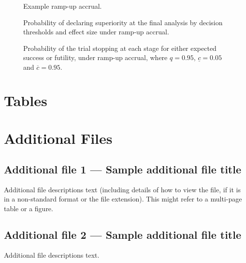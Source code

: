 \documentclass{bmcart}
\begin{document}
\begin{backmatter}
\begin{figure}[!ht] 	  	  	  
	\caption{Example ramp-up accrual.}
	\label{fig:accrual-ru}
\end{figure}

\begin{figure}[!ht]
	\caption{Probability of declaring superiority at the final analysis by decision thresholds and effect size under ramp-up accrual.}
	\label{fig:decisions-ru}
\end{figure}

\begin{figure}[!ht]
	\caption{Probability of the trial stopping at each stage for either expected success or futility, under ramp-up accrual, where \(q=0.95\), \(\underline{c}=0.05\) and \(\overline{c}=0.95\).}\label{fig:stop-ru}
\end{figure}


\section*{Tables}









\section*{Additional Files}
  \subsection*{Additional file 1 --- Sample additional file title}
    Additional file descriptions text (including details of how to
    view the file, if it is in a non-standard format or the file extension).  This might
    refer to a multi-page table or a figure.

  \subsection*{Additional file 2 --- Sample additional file title}
    Additional file descriptions text.

\end{backmatter}
\end{document}
